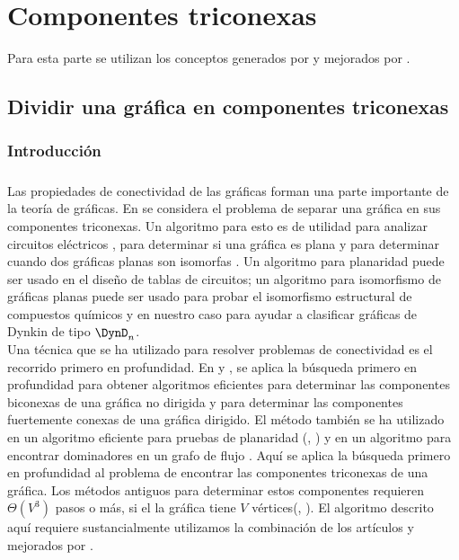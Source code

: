 \chapter{Componentes triconexas}

Para esta parte se utilizan los conceptos generados por \citep{hopcroft1973} y mejorados por \citep{Gutwenger2000ALT}.

\section{Dividir una gráfica en componentes triconexas}

\subsection{Introducción}

\paragraph{}
Las propiedades de conectividad de las gráficas forman una parte importante de la teoría de gráficas. En \citep{hopcroft1973} se considera el problema de separar una gráfica en sus componentes triconexas. Un algoritmo para esto es de utilidad para analizar circuitos eléctricos \citep{1083313} , para determinar si una gráfica es plana \citep{10893101} y para determinar cuando dos gráficas planas son isomorfas \citep{Hopcroft1972}. Un algoritmo para planaridad puede ser usado en el diseño de tablas de circuitos; un algoritmo para isomorfismo de gráficas planas puede ser usado para probar el isomorfismo estructural de compuestos químicos \citep{Lederberg1964DENDRAL64AS} y en nuestro caso para ayudar a clasificar gráficas de Dynkin de tipo $\DynD_{n}$.\\

Una técnica que se ha utilizado para resolver problemas de conectividad es el recorrido primero en profundidad. En \citep{4569669} y \citep{efalgm}, se aplica la búsqueda primero en profundidad para obtener algoritmos eficientes para determinar las componentes biconexas de una gráfica no dirigida y para determinar las componentes fuertemente conexas de una gráfica dirigido. El método también se ha utilizado en un algoritmo eficiente para pruebas de planaridad (\citep{tarjan1971efficient}, \citep{ept}) y en un algoritmo para encontrar dominadores en un grafo de flujo \citep{Tarjan1974FindingDI}. Aquí se aplica la búsqueda primero en profundidad al problema de encontrar las componentes triconexas de una gráfica. Los métodos antiguos para determinar estos componentes requieren $\Theta\left(V^{3}\right)$ pasos o más, si el la gráfica tiene $V$ vértices(\citep{1083313}, \cite{1082941}). El algoritmo descrito aquí requiere sustancialmente utilizamos la combinación de los artículos \citep{hopcroft1973} y mejorados por \citep{Gutwenger2000ALT}.\\

